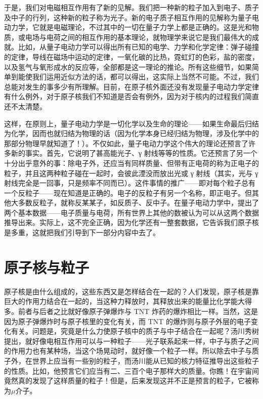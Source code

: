 于是，我们对电磁相互作用有了新的见解。我们把一种新的粒子加入到电子、质子及中子的行列，这种新的粒子称为光子。新的电子质子相互作用的见解称为量子电动力学，它就是电磁理论，不过其中的一切在量子力学上都是正确的。这是光和物质，或电场与电荷之间的相互作用的基本理论，就物理学来说它是我们最伟大的成就。比如，从量子电动力学可以得出所有已知的电学、力学和化学定律：弹子碰撞的定律，导线在磁场中运动的定律，一氧化碳的比热，霓虹灯的色彩，盐的密度，以及氢气与氧形成水的反应等，全部都是这一理论的推论。所有这些细节，如果简单到能使我们运用近似方法的话，都可以得出，这实际上当然不可能。不过，我们总能对发生的事多少有所理解。目前，在原子核外面还没有发现量子电动力学定律有什么例外，对于原子核我们不知道是否会有例外，因为对于核内的过程我们简直还不太清楚。

这样，在原则上，量子电动力学是一切化学以及生命的理论——如果生命最后归结为化学，因而也就归结为物理的话（因为化学本身已经归结为物理，涉及化学中的那部分物理早就知道了！）。不仅如此，量子电动力学这个伟大的理论还预言了许多新的事实。首先，它说明了甚高能光子、γ 射线等等的性质。它还预言了另一个十分出乎意外的事：除电子外，还应当有同样质量、但带有正电荷的称为正电子的粒子，并且这两种粒子碰在一起时，会彼此湮没而放出光或 γ 射线（其实，光与 γ 射线完全是一回事，只是频率不同而已）。这件事情的推广——即对每个粒子总有一个反粒子——现在知道是正确的。电子的反粒子有另一个名称，即正电子。但其他大多数反粒子，就称反某某子，如反质子、反中子。在量子电动力学中，提出了两个基本数据——电子质量与电荷，所有世界上其他的数被认为可以从这两个数据推导出来。实际上，这不完全正确，因为化学还有一整套数据，它告诉我们原子核是多重，这就把我们引导到下一部分内容中去了。


\section{原子核与粒子}

原子核是由什么组成的，这些东西又是怎样结合在一起的？人们发现，原子核是靠巨大的作用力结合在一起的，当这种力释放时，其释放出来的能量比化学能大得多。前者与后者之比就好像原子弹爆炸与 TNT 炸药的爆炸相比一样。当然，这是因为原子弹爆炸时与原子核里的变化有关，而 TNT 的爆炸则与原子外层的电子变化有关。问题是，究竟是什么力使原子核中的质子与中子结合在一起呢？汤川秀树提出，就好像电相互作用可以与一种粒子——光子联系起来一样，中子与质子之间的作用力也有某种场，当这个场晃动时，就好像一个粒子一样。所以除去中子与质子外，在世界上应当有一些别的粒子，而汤川能从已知的核力特征推导出这些粒子的性质。比如，他预言它们应当有二、三百个电子那样大的质量。你瞧！在宇宙间竟然真的发现了这样质量的粒子！但是，后来发现这并不正是预言的粒子，它被称为$\mu$介子。

